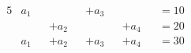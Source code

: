 \begin{alignat}{5}
  & a_1 & &      & &+ a_3 & &      & &= 10 \\
  &     & &+ a_2 & &      & &+ a_4 & &= 20 \\
  & a_1 & &+ a_2 & &+ a_3 & &+ a_4 & &= 30
\end{alignat}
